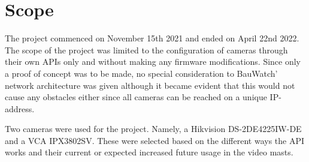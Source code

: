 \section{Scope}


The project commenced on November 15th 2021 and ended on April 22nd 2022. The scope of the project was limited to the configuration of cameras through their own APIs only and
without making any firmware modifications. Since only a proof of concept was to be made, no special consideration to BauWatch' network architecture was given although it became
evident that this would not cause any obstacles either since all cameras can be reached on a unique IP-address.

Two cameras were used for the project. Namely, a Hikvision DS-2DE4225IW-DE and a VCA IPX3802SV. These were selected based on the different ways the API works
and their current or expected increased future usage in the video masts.
